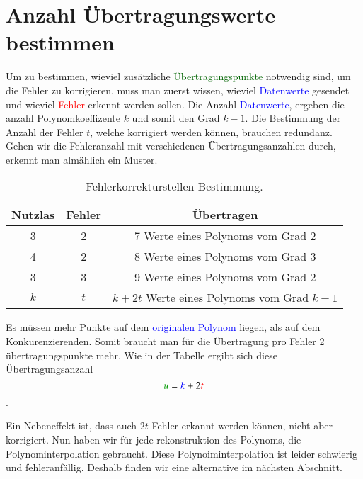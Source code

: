 \section{Anzahl Übertragungswerte bestimmen
\label{reedsolomon:section:Fehlerkorrekturstellen}}
Um zu bestimmen, wieviel zusätzliche \textcolor{darkgreen}{Übertragungspunkte} notwendig sind, um die Fehler zu korrigieren,
    muss man zuerst wissen, wieviel \textcolor{blue}{Datenwerte} gesendet und wieviel \textcolor{red}{Fehler} erkennt werden sollen. 
Die Anzahl \textcolor{blue}{Datenwerte}, ergeben die anzahl Polynomkoeffizente $k$ und somit den Grad $k-1$.
Die Bestimmung der Anzahl der Fehler $t$, welche korrigiert werden können, brauchen redundanz.
Gehen wir die Fehleranzahl mit verschiedenen Übertragungsanzahlen durch, 
    erkennt man almählich ein Muster.
\begin{table}
    \centering
    \begin{tabular}{ c c | c} 
        \hline
        Nutzlas & Fehler & Übertragen \\
        \hline 
        3 & 2 & 7 Werte eines Polynoms vom Grad 2 \\ 
        4 & 2 & 8 Werte eines Polynoms vom Grad 3 \\
        3 & 3 & 9 Werte eines Polynoms vom Grad 2 \\ 
        \hline
        $k$ & $t$ & $k+2t$ Werte eines Polynoms vom Grad $k-1$ \\ 
        \hline
    \end{tabular}
    \caption{ Fehlerkorrekturstellen Bestimmung.}
    \label{tab:fehlerkorrekturstellen}
\end{table}
Es müssen mehr Punkte auf dem \textcolor{blue}{originalen Polynom} liegen, als auf dem Konkurenzierenden.
Somit braucht man für die Übertragung pro Fehler 2 übertragungspunkte mehr.
Wie in der Tabelle ergibt sich diese Übertragungsanzahl
\begin{equation}
    \textcolor{darkgreen}{u}=
    \textcolor{blue}{k}+2\textcolor{red}{t}
    \label{reedsolomon:equation2}
\end{equation}.

Ein Nebeneffekt ist, dass auch $2t$ Fehler erkannt werden können, nicht aber korrigiert.
Nun haben wir für jede rekonstruktion des Polynoms, die Polynominterpolation gebraucht.
Diese Polynoiminterpolation ist leider schwierig und fehleranfällig.
Deshalb finden wir eine alternative im nächsten Abschnitt.

